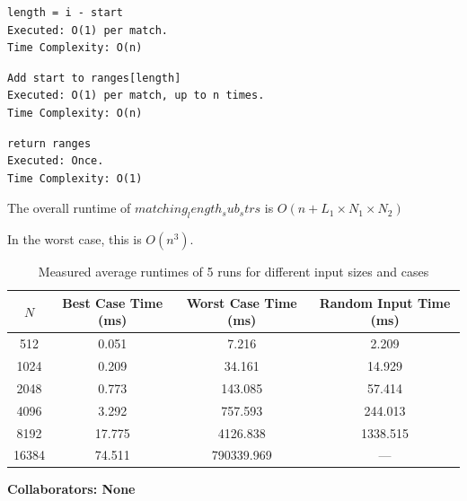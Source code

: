 \documentclass[12 pt]{article}
\begin{document}
\begin{verbatim}
length = i - start
Executed: O(1) per match.
Time Complexity: O(n)
\end{verbatim}

\begin{verbatim}
Add start to ranges[length]
Executed: O(1) per match, up to n times.
Time Complexity: O(n)
\end{verbatim}

\begin{verbatim}
return ranges
Executed: Once.
Time Complexity: O(1)
\end{verbatim}

The overall runtime of $matching_length_sub_strs$ is $O(n + L_1 \times N_1 \times N_2)$

In the worst case, this is $O(n^3)$.

\begin{table}[h!]
\centering
\begin{tabular}{|c|c|c|c|}
\hline
$N$ & Best Case Time (ms) & Worst Case Time (ms) & Random Input Time (ms) \\
\hline
512   & 0.051    & 7.216      & 2.209     \\
\hline
1024  & 0.209    & 34.161     & 14.929    \\
\hline
2048  & 0.773    & 143.085    & 57.414    \\
\hline
4096  & 3.292    & 757.593    & 244.013   \\
\hline
8192  & 17.775   & 4126.838   & 1338.515  \\
\hline
16384 & 74.511   & 790339.969 & ---       \\
\hline
\end{tabular}
\caption{Measured average runtimes of 5 runs for different input sizes and cases}
\label{tab:runtime_data}
\end{table}



\noindent\textbf{Collaborators: None}
\end{document}
